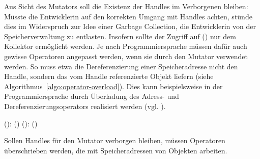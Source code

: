 Aus Sicht des Mutators soll die Existenz der Handles im Verborgenen bleiben:
Müsste die Entwicklerin auf den korrekten Umgang mit Handles achten, stünde dies im Widerspruch zur Idee einer Garbage Collection, die Entwicklerin von der Speicherverwaltung zu entlasten.
Insofern sollte der Zugriff auf () nur dem Kollektor ermöglicht werden.
Je nach Programmiersprache müssen dafür auch gewisse Operatoren angepasst werden, wenn sie durch den Mutator verwendet werden.
So muss etwa die Dereferenzierung einer Speicheradresse nicht den Handle, sondern das vom Handle referenzierte Objekt liefern (siehe Algorithmus~\ref{algo:operator-overload}).
Dies kann beispielsweise in der Programmiersprache \Cpp durch Überladung des Adress- und Dereferenzierungsoperators realisiert werden (vgl. \cite[Kap. 18]{cpp}).

\begin{algorithm}
\begin{algorithmic}[1]
	\State {}():
	\State \quad \Return {}()		
	\Statex
	\State {}():
	\State \quad \Return {}()		
\end{algorithmic}
\caption[Operatoranpassung zur Verbergung von Handles]{Sollen Handles für den Mutator verborgen bleiben, müssen Operatoren überschrieben werden, die mit Speicheradressen von Objekten arbeiten.}
\label{algo:operator-overload}
\end{algorithm}

